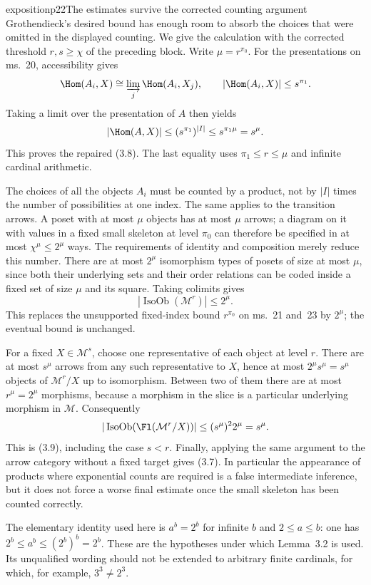 \begin{dcomment}{exposition}{p22}{The estimates survive the corrected counting argument}
Grothendieck's desired bound has enough room to absorb the choices that were omitted in the displayed counting. We give the calculation with the corrected threshold $r,s\geq\chi$ of the preceding block. Write $\mu=r^{\pi_0}$. For the presentations on ms.~20, accessibility gives
\[
\Hom(A_i,X)\cong\varinjlim_j\Hom(A_i,X_j),
\qquad |\Hom(A_i,X)|\leq s^{\pi_1}.
\]
Taking a limit over the presentation of $A$ then yields
\[
|\Hom(A,X)|\leq (s^{\pi_1})^{|I|}
\leq s^{\pi_1\mu}=s^\mu.
\]
This proves the repaired (3.8). The last equality uses $\pi_1\leq r\leq\mu$ and infinite cardinal arithmetic.

The choices of all the objects $A_i$ must be counted by a product, not by $|I|$ times the number of possibilities at one index. The same applies to the transition arrows. A poset with at most $\mu$ objects has at most $\mu$ arrows; a diagram on it with values in a fixed small skeleton at level $\pi_0$ can therefore be specified in at most $\chi^\mu\leq 2^\mu$ ways. The requirements of identity and composition merely reduce this number. There are at most $2^\mu$ isomorphism types of posets of size at most $\mu$, since both their underlying sets and their order relations can be coded inside a fixed set of size $\mu$ and its square. Taking colimits gives
\[
|\operatorname{IsoOb}(\mathcal M^r)|\leq 2^\mu.
\]
This replaces the unsupported fixed-index bound $r^{\pi_0}$ on ms.~21 and~23 by $2^\mu$; the eventual bound is unchanged.

For a fixed $X\in\mathcal M^s$, choose one representative of each object at level $r$. There are at most $s^\mu$ arrows from any such representative to $X$, hence at most $2^\mu s^\mu=s^\mu$ objects of $\mathcal M^r/X$ up to isomorphism. Between two of them there are at most $r^\mu=2^\mu$ morphisms, because a morphism in the slice is a particular underlying morphism in $\mathcal M$. Consequently
\[
|\operatorname{IsoOb}(\Fl(\mathcal M^r/X))|
\leq(s^\mu)^2 2^\mu=s^\mu.
\]
This is (3.9), including the case $s<r$. Finally, applying the same argument to the arrow category without a fixed target gives (3.7). In particular the appearance of products where exponential counts are required is a false intermediate inference, but it does not force a worse final estimate once the small skeleton has been counted correctly.

The elementary identity used here is $a^b=2^b$ for infinite $b$ and $2\leq a\leq b$: one has $2^b\leq a^b\leq(2^b)^b=2^b$. These are the hypotheses under which Lemma~3.2 is used. Its unqualified wording should not be extended to arbitrary finite cardinals, for which, for example, $3^3\ne2^3$.
\end{dcomment}

